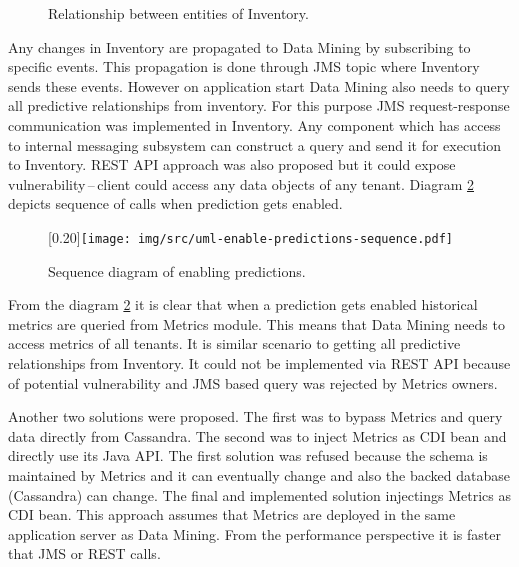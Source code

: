     \begin{figure}[H]
        \begin{center}
            \caption{Relationship between entities of Inventory.}
            \label{img:relationship}
        \end{center}
    \end{figure}

    Any changes in Inventory are propagated to Data Mining by subscribing to specific events. This propagation is done
    through JMS topic where Inventory sends these events. However on application start Data Mining also needs to query
    all predictive relationships from inventory. For this purpose JMS request-response communication was implemented in
    Inventory. Any component which has access to internal messaging subsystem can construct a query and send it for
    execution to Inventory. REST API approach was also proposed but it could expose vulnerability\,--\,client
    could access any data objects of any tenant. Diagram \ref{img:sequence-enab-pred} depicts sequence of calls
    when prediction gets enabled.

    \begin{figure}[H]
        \begin{center}
            \scalebox{0.30}[0.20]{\texttt{[image: img/src/uml-enable-predictions-sequence.pdf]}}
            \caption{Sequence diagram of enabling predictions.}
            \label{img:sequence-enab-pred}
        \end{center}
    \end{figure}

    From the diagram \ref{img:sequence-enab-pred} it is clear that when a prediction gets enabled historical metrics are
    queried from Metrics module. This means that Data Mining needs to access metrics of all tenants. It is
    similar scenario to getting all predictive relationships from Inventory. It could not be implemented via REST API
    because of potential vulnerability and JMS based query was rejected by Metrics owners.

    Another two solutions were proposed. The first was to bypass Metrics and query data directly from Cassandra.
    The second was to inject Metrics as CDI bean and directly use its Java API. The first solution was refused because
    the schema is maintained by Metrics and it can eventually change and also the backed database (Cassandra) can
    change. The final and implemented solution injectings Metrics as CDI bean. This approach assumes that Metrics
    are deployed in the same application server as Data Mining. From the performance perspective it is faster that
    JMS or REST calls.

